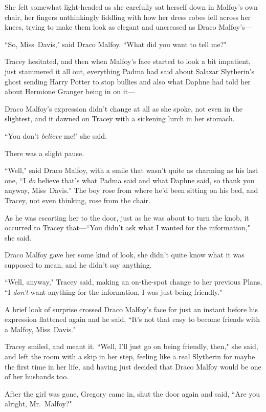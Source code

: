 She felt somewhat light-headed as she carefully sat herself down in Malfoy's own chair, her fingers unthinkingly fiddling with how her dress robes fell across her knees, trying to make them look as elegant and uncreased as Draco Malfoy's—

``So, Miss~Davis," said Draco Malfoy. ``What did you want to tell me?"

Tracey hesitated, and then when Malfoy's face started to look a bit impatient, just stammered it all out, everything Padma had said about Salazar Slytherin's ghost sending Harry Potter to stop bullies and also what Daphne had told her about Hermione Granger being in on it—

Draco Malfoy's expression didn't change at all as she spoke, not even in the slightest, and it dawned on Tracey with a sickening lurch in her stomach.

``You don't \emph{believe} me!" she said.

There was a slight pause.

``Well," said Draco Malfoy, with a smile that wasn't quite as charming as his last one, ``I \emph{do} believe that's what Padma said and what Daphne said, so thank you anyway, Miss~Davis." The boy rose from where he'd been sitting on his bed, and Tracey, not even thinking, rose from the chair.

As he was escorting her to the door, just as he was about to turn the knob, it occurred to Tracey that—``You didn't ask what I wanted for the information," she said.

Draco Malfoy gave her some kind of look, she didn't quite know what it was supposed to mean, and he didn't say anything.

``Well, anyway," Tracey said, making an on-the-spot change to her previous Plans, ``I \emph{don't} want anything for the information, I was just being friendly."

A brief look of surprise crossed Draco Malfoy's face for just an instant before his expression flattened again and he said, ``It's not that easy to become friends with a Malfoy, Miss~Davis."

Tracey smiled, and meant it. ``Well, I'll just go on being friendly, then," she said, and left the room with a skip in her step, feeling like a real Slytherin for maybe the first time in her life, and having just decided that Draco Malfoy would be one of her husbands too.

\later

After the girl was gone, Gregory came in, shut the door again and said, ``Are you alright, Mr.~Malfoy?"

